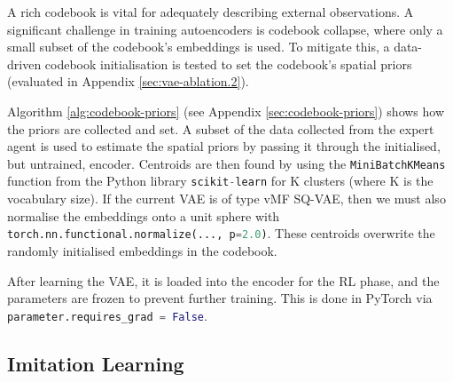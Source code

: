 A rich codebook is vital for adequately describing external observations.
A significant challenge in training autoencoders is codebook collapse, where only a small subset of the codebook's embeddings is used.
To mitigate this, a data-driven codebook initialisation is tested to set the codebook's spatial priors (evaluated in Appendix \ref{sec:vae-ablation.2}).

Algorithm \ref{alg:codebook-priors} (see Appendix \ref{sec:codebook-priors}) shows how the priors are collected and set.
A subset of the data collected from the expert agent is used to estimate the spatial priors by passing it through the initialised, but untrained, encoder.
Centroids are then found by using the \lstinline[language=Python]|MiniBatchKMeans| function from the Python library \lstinline[language=Python]|scikit-learn| for K clusters (where K is the vocabulary size).
If the current VAE is of type vMF SQ-VAE, then we must also normalise the embeddings onto a unit sphere with \lstinline[language=Python]|torch.nn.functional.normalize(..., p=2.0)|.
These centroids overwrite the randomly initialised embeddings in the codebook.



After learning the VAE, it is loaded into the encoder for the RL phase, and the parameters are frozen to prevent further training.
This is done in PyTorch via \lstinline[language=Python]|parameter.requires_grad = False|.

\subsection{Imitation Learning}
\label{sec:3.6.3}

